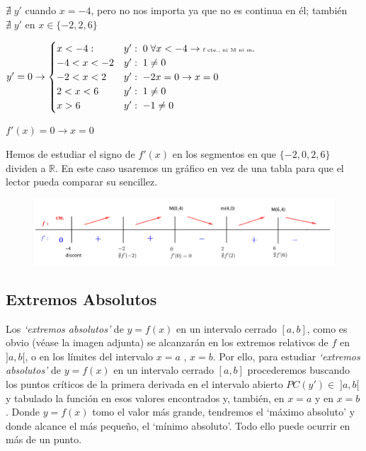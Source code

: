 \begin{ejem}
\begin{itemize}
	$\nexists \; y'$ cuando $x=-4$, pero no nos importa ya que no es continua en él; también  $\nexists \; y'$  en $x \in \{-2, 2 , 6\}$
	
	$y'=0 \to \begin{cases}
	x<-4: & y':\; 0 \;  \forall x<-4 \to \tiny{\mbox{f cte., ni M ni m}} \normalsize{.} \\
	-4<x<-2  & y':\;  1 \neq 0 \\
	-2<x<2 & y':\;  -2x=0 \to x=0 \\
	2<x<6 & y':\;  1 \neq 0 \\
	x>6 & y':\;  -1 \neq 0
 	\end{cases} $
 	
 	$ f'(x)=0 \to x=0$

	Hemos de estudiar el signo de $f'(x)$ en los segmentos en que $\{-2, 0, 2 , 6\}$ dividen a $\mathbb R$. En este caso usaremos un gráfico en vez de una tabla para que el lector pueda comparar su sencillez.
	
	
	\end{itemize}
	
	
	\begin{figure}[H]
		\centering
		\includegraphics[width=1\textwidth]{imagenes/imagenes05/T05IM09.png}
	\end{figure}
			
	\end{ejem}


	\subsection{Extremos Absolutos}
	
	Los \emph{`extremos absolutos'} de $y=f(x)$ en un intervalo cerrado $[a,b]$, como es obvio (véase la imagen adjunta) se alcanzarán en los extremos relativos de $f$ en $]a,b[$, o en los límites del intervalo $x=a$ , $x=b$. Por ello, para estudiar \emph{`extremos absolutos'} de $y=f(x)$ en un intervalo cerrado $[a,b]$ procederemos buscando los puntos críticos de la primera derivada en el intervalo abierto $PC(y')\in\;  ]a,b[$ y tabulado la función en esos valores encontrados y, también, en $x=a$ y en $x=b$. Donde $y=f(x)$ tomo el valor más grande, tendremos el `máximo absoluto' y donde alcance el más pequeño, el `mínimo absoluto'. Todo ello puede ocurrir en más de un punto.
	
